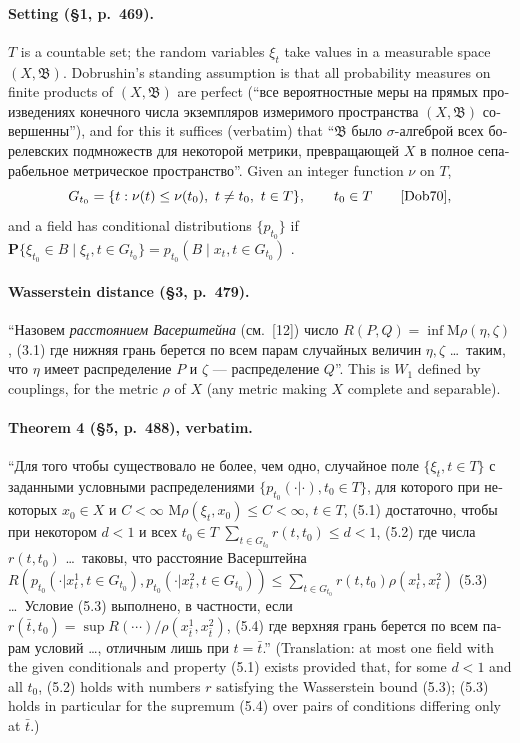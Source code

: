 \documentclass[11pt,a4paper]{article}
\theoremstyle{remark}
\theoremstyle{definition}
\theoremstyle{plain}
\theoremstyle{remark}
\newcommand{\ru}[1]{\foreignlanguage{russian}{#1}}
\begin{document}
\paragraph{Setting (\S1, p.~469).} $T$ is a countable set; the random variables $\xi_t$ take values in a
measurable space $(X,\mathfrak B)$. Dobrushin's standing assumption is that all probability measures on
finite products of $(X,\mathfrak B)$ are perfect (``\ru{все вероятностные меры на прямых произведениях
конечного числа экземпляров измеримого пространства $(X,\mathfrak B)$ совершенны}''), and for this it
suffices (verbatim) that
``\ru{$\mathfrak B$ было $\sigma$-алгеброй всех борелевских подмножеств для некоторой метрики,
превращающей $X$ в полное сепарабельное метрическое пространство}''.
Given an integer function $\nu$ on $T$,
\begin{equation*}
G_{t_0}=\{t:\nu(t)\le\nu(t_0),\ t\neq t_0,\ t\in T\},\qquad t_0\in T \qquad\text{\cite[(1.2)]{Dob70}},
\end{equation*}
and a field has conditional distributions $\{p_{t_0}\}$ if
$\mathbf P\{\xi_{t_0}\in B\mid\xi_t,t\in G_{t_0}\}=p_{t_0}(B\mid x_t,t\in G_{t_0})$ \cite[(1.3)]{Dob70}.

\paragraph{Wasserstein distance (\S3, p.~479).}
``\ru{Назовем \emph{расстоянием Васерштейна} (см.~[12]) число}
$R(P,Q)=\inf \mathrm{M}\rho(\eta,\zeta)$, (3.1)
\ru{где нижняя грань берется по всем парам случайных величин $\eta,\zeta$ \dots\ таким, что $\eta$ имеет
распределение $P$ и $\zeta$ --- распределение $Q$}''. This is $W_1$ defined by couplings, for the metric
$\rho$ of $X$ (any metric making $X$ complete and separable).

\paragraph{Theorem 4 (\S5, p.~488), verbatim.}
``\ru{Для того чтобы существовало не более, чем одно, случайное поле $\{\xi_t, t\in T\}$ с заданными
условными распределениями $\{p_{t_0}(\cdot|\cdot), t_0\in T\}$, для которого при некоторых $x_0\in X$ и
$C<\infty$}
$\mathrm{M}\rho(\xi_t,x_0)\le C<\infty$, $t\in T$, (5.1)
\ru{достаточно, чтобы при некотором $d<1$ и всех $t_0\in T$}
$\sum_{t\in G_{t_0}} r(t,t_0)\le d<1$, (5.2)
\ru{где числа $r(t,t_0)$ \dots\ таковы, что расстояние Васерштейна}
$R(p_{t_0}(\cdot|x^1_t,t\in G_{t_0}),p_{t_0}(\cdot|x^2_t,t\in G_{t_0}))\le\sum_{t\in G_{t_0}}r(t,t_0)\rho(x^1_t,x^2_t)$ (5.3)
\ru{\dots\ Условие (5.3) выполнено, в частности, если}
$r(\bar t,t_0)=\sup R(\cdots)/\rho(x^1_{\bar t},x^2_{\bar t})$, (5.4)
\ru{где верхняя грань берется по всем парам условий \dots, отличным лишь при $t=\bar t$}.''
(Translation: at most one field with the given conditionals and property (5.1) exists provided that, for
some $d<1$ and all $t_0$, (5.2) holds with numbers $r$ satisfying the Wasserstein bound (5.3); (5.3)
holds in particular for the supremum (5.4) over pairs of conditions differing only at $\bar t$.)
\end{document}
